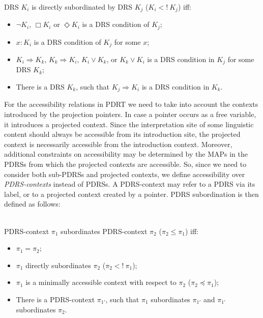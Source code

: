 \begin{subdefinition}\label{def:DRSdsub}~\\
DRS $K_i$ is directly subordinated by DRS $K_j$ ($K_i <!~K_j$) iff:
  \begin{itemize}
    \item $\neg K_i$, $\Box K_i$ or $\Diamond K_i$ is a DRS condition of
      $K_j$;
    \item $x:K_i$ is a DRS condition of $K_j$ for some $x$;
    \item $K_i \Rightarrow K_k$, $K_k \Rightarrow K_i$, $K_i \vee K_k$, or 
      $K_k \vee K_i$ is a DRS condition in $K_j$ for some DRS $K_k$;
    \item There is a DRS $K_k$, such that $K_j \Rightarrow K_i$
      is a DRS condition in $K_k$.
  \end{itemize}
\end{subdefinition}


For the accessibility relations in PDRT we need to take into account the
contexts introduced by the projection pointers.  In case a pointer occurs as
a free variable, it introduces a projected context. Since the interpretation
site of some linguistic content should always be accessible from its
introduction site, the projected context is necessarily accessible from the
introduction context. Moreover, additional constraints on accessibility may
be determined by the MAPs in the PDRSs from which the projected contexts
are accessible.
So, since we need to consider both sub-PDRSs and projected
contexts, we define accessibility over \textit{PDRS-contexts} instead of
PDRSs.  A PDRS-context may refer to a PDRS via its label, or to
a projected context created by a pointer. PDRS subordination is then defined
as follows:

\begin{definition}\label{def:PDRSsub}~\\
PDRS-context $\pi_1$ subordinates PDRS-context $\pi_2$ ($\pi_2 \leq \pi_1$)
iff:
\begin{itemize}
  \item $\pi_1 = \pi_2$;
  \item $\pi_1$ directly subordinates $\pi_2$ ($\pi_2 <!~\pi_1$);
  \item $\pi_1$ is a minimally accessible context with respect to $\pi_2$
    ($\pi_2 \preceq \pi_1$);    
  \item There is a PDRS-context $\pi_{1'}$, such that $\pi_1$ subordinates
    $\pi_{1'}$ and $\pi_{1'}$ subordinates $\pi_2$.
\end{itemize}
\end{definition}

